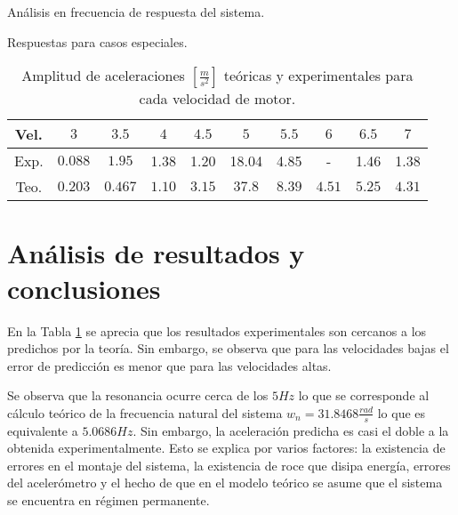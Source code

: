 \documentclass[letterpaper,11pt]{article} %
\begin{document}
\newpage
\begin{images}[\label{fig:2}]{Análisis en frecuencia de respuesta del sistema.}
\end{images}
\begin{images}[\label{fig:3}]{Respuestas para casos especiales.}
\end{images}
\newpage
\begin{table}[hbt]
    \centering
    \begin{tabular}{c|c|c|c|c|c|c|c|c|c}
        Vel.&$3$&$3.5$&$4$&$4.5$&$5$&$5.5$&$6$&$6.5$&$7$\\
        \hline
          Exp.&$0.088$&$1.95$&1.38&1.20&18.04&4.85&-&1.46&1.38\\
          Teo.&$0.203$&$0.467$&$1.10$&$3.15$&$37.8$&$8.39$&$4.51$&$5.25$&$4.31$
         
    \end{tabular}
    \caption{Amplitud de aceleraciones $[\frac{m}{s^2}]$ teóricas y experimentales para cada velocidad de motor.}
    \label{tab:ffff}
\end{table}
\section{Análisis de resultados y conclusiones}
En la Tabla \ref{tab:ffff} se aprecia que los resultados experimentales son cercanos a los predichos por la teoría.  Sin embargo, se observa que para las velocidades bajas el error de predicción es menor que para las velocidades altas.

Se observa que la resonancia ocurre cerca de los $5 Hz$ lo que se corresponde al cálculo teórico de la frecuencia natural del sistema $w_n=31.8468 \frac{rad}{s}$ lo que es equivalente a $5.0686 Hz$.  Sin embargo, la aceleración predicha es casi el doble a la obtenida experimentalmente.  Esto se explica por varios factores: la existencia de errores en el montaje del sistema, la existencia de roce que disipa energía, errores del acelerómetro y el hecho de que en el modelo teórico se asume que el sistema se encuentra en régimen permanente. 
\end{document}
